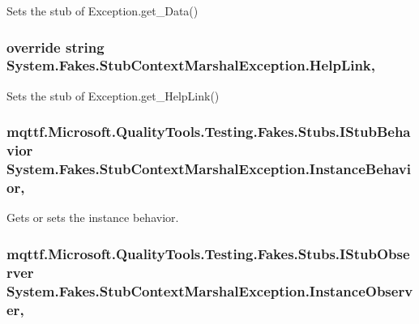 Sets the stub of Exception.\-get\-\_\-\-Data()

\hypertarget{class_system_1_1_fakes_1_1_stub_context_marshal_exception_a825e5b72be08b5025f64cd4d3c0ff818}{
\subsubsection[{Help\-Link}]{\setlength{\rightskip}{0pt plus 5cm}override string System.\-Fakes.\-Stub\-Context\-Marshal\-Exception.\-Help\-Link\hspace{0.3cm}{\ttfamily [get]}, {\ttfamily [set]}}}\label{class_system_1_1_fakes_1_1_stub_context_marshal_exception_a825e5b72be08b5025f64cd4d3c0ff818}


Sets the stub of Exception.\-get\-\_\-\-Help\-Link()

\hypertarget{class_system_1_1_fakes_1_1_stub_context_marshal_exception_a447b39b5642ef99e6c361c7532ce818c}{
\subsubsection[{Instance\-Behavior}]{\setlength{\rightskip}{0pt plus 5cm}mqttf.\-Microsoft.\-Quality\-Tools.\-Testing.\-Fakes.\-Stubs.\-I\-Stub\-Behavior System.\-Fakes.\-Stub\-Context\-Marshal\-Exception.\-Instance\-Behavior\hspace{0.3cm}{\ttfamily [get]}, {\ttfamily [set]}}}\label{class_system_1_1_fakes_1_1_stub_context_marshal_exception_a447b39b5642ef99e6c361c7532ce818c}


Gets or sets the instance behavior.

\hypertarget{class_system_1_1_fakes_1_1_stub_context_marshal_exception_a5904f00ef603a30755c73e84559b496e}{
\subsubsection[{Instance\-Observer}]{\setlength{\rightskip}{0pt plus 5cm}mqttf.\-Microsoft.\-Quality\-Tools.\-Testing.\-Fakes.\-Stubs.\-I\-Stub\-Observer System.\-Fakes.\-Stub\-Context\-Marshal\-Exception.\-Instance\-Observer\hspace{0.3cm}{\ttfamily [get]}, {\ttfamily [set]}}}\label{class_system_1_1_fakes_1_1_stub_context_marshal_exception_a5904f00ef603a30755c73e84559b496e}


